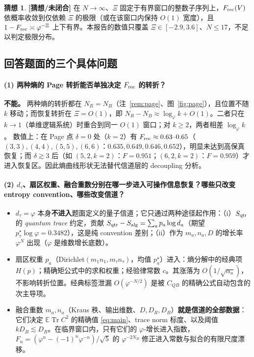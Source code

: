 \documentclass[11pt,a4paper]{ctexart}
\theoremstyle{definition}
\newtheorem{conjecture}{猜想}
\newcommand{\conj}{\textcolor{red!70!black}{\textbf{[猜想/未闭合]}}}
\newcommand{\Tr}{\operatorname{Tr}}
\newcommand{\E}{\mathbb{E}}
\newcommand{\ph}{\varphi}
\begin{document}
\begin{conjecture}\conj{} 在 $N\to\infty$、$\Xi$ 固定于有界窗口的整数子序列上，$F_{\rm rec}(V)$ 依概率收敛到仅依赖 $\Xi$ 的极限（或在该窗口内保持 $O(1)$ 宽度），且 $1-F_{\rm rec}\asymp\ph^{-\Xi}$ 上下有界。本报告的数值只覆盖 $\Xi\in[-2.9,3.6]$、$N\le17$，不足以判定极限分布。
\end{conjecture}

\subsection{回答题面的三个具体问题}

\paragraph{(1) 两种熵的 Page 转折能否单独决定 $F_{\rm rec}$ 的转折？}
\textbf{不能。} 两种熵的转折都在 $N_R=N_B$（注~\ref{rem:page}、图~\ref{fig:page}），且位置不随 $k$ 移动；而恢复转折在 $\Xi=O(1)$，即
$N_R-N_B\approx\log_\ph k+O(1)$。二者只在 $k\to1$（单维逻辑系统）时重合到同一 $O(1)$ 窗口；对 $k\ge2$，两者相差 $\log_\ph k$。
数值上：在 Page 点 $\delta=0$ 处（$k=2$）有 $F_{\rm rec}\approx0.63\text{--}0.65$（$(3,3),(4,4),(5,5),(6,6)$：$0.635,0.649,0.646,0.652$），明显未达到高保真恢复；而 $\delta\gtrsim3$ 后（如 $(5,2,k=2)$：$F=0.951$；$(6,2,k=2)$：$F=0.959$）才进入恢复区。因此熵曲线形状无法替代信道层的 decoupling 分析。

\paragraph{(2) $d_\tau$、扇区权重、融合重数分别在哪一步进入可操作信息恢复？哪些只改变 entropy convention、哪些改变信道？}
\begin{itemize}[leftmargin=1.6em]
\item $d_\tau=\ph$ 本身\textbf{不进入}题面定义的量子信道；它只通过两种途径起作用：（i）$S_{\rm qtr}$ 的 \emph{quantum trace} 约定，贡献 $S_{\rm qtr}-S_{\rm alg}=\sum_ap_a\log d_a$（期望 $p_\tau^\star\log\ph=0.3482$），这是纯 convention 差别；（ii）作为 $m_a,n_a,D$ 的增长率 $\ph^{N}$ 出现（$\ph$ 是维数增长底数）。
\item 扇区权重 $p_a$（Dirichlet$(m_1n_1,m_\tau n_\tau)$，均值 $p_a^\star$）进入：熵分解中的经典项 $H(p)$；精确矩公式中的求和权重；经验律常数 $c$。其涨落为 $O(1/\sqrt{\alpha_a})$，不影响转折位置。经典标签泄漏 $O(\ph^{-N/2})$ 是被 $C_{QB}$ 的精确公式自动包含的次主导项。
\item 融合重数 $m_a,n_a$（Kraus 秩、输出维数、$D,D_R,D_B$）\textbf{就是信道的全部数据}：它们决定 $\E\Tr C^2$ 的精确值 \eqref{eq:main}、trace norm 标度、以及阈值 $kD_B\lesssim D_R$。在临界窗口内，只有它们的 $\ph$-增长进入指数，$F_n=(\ph^n-(-1)^n\ph^{-n})/\sqrt5$ 的 $\ph^{-2N_B}$ 修正进入常数与拟合的有限尺度漂移。
\end{itemize}
\end{document}
